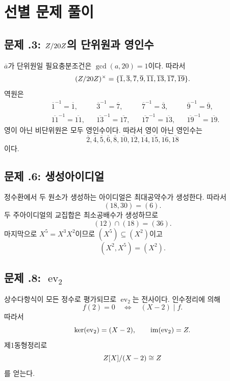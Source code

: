 \section{선별 문제 풀이}
\label{sec:ring-selected-solutions}

\subsection*{문제 \thechapter.3: $Z/20Z$의 단위원과 영인수}

\begin{solution}
$\overline a$가 단위원일 필요충분조건은 $\gcd(a,20)=1$이다. 따라서
\[
  (Z/20Z)^\times
  =\{\overline1,\overline3,\overline7,\overline9,
      \overline{11},\overline{13},\overline{17},\overline{19}\}.
\]
역원은
\[
\begin{aligned}
&\overline1^{-1}=\overline1,
&&\overline3^{-1}=\overline7,
&&\overline7^{-1}=\overline3,
&&\overline9^{-1}=\overline9,\\
&\overline{11}^{-1}=\overline{11},
&&\overline{13}^{-1}=\overline{17},
&&\overline{17}^{-1}=\overline{13},
&&\overline{19}^{-1}=\overline{19}.
\end{aligned}
\]
영이 아닌 비단위원은 모두 영인수이다. 따라서 영이 아닌 영인수는
\[
  \overline2,\overline4,\overline5,\overline6,\overline8,
  \overline{10},\overline{12},\overline{14},\overline{15},
  \overline{16},\overline{18}
\]
이다.
\end{solution}

\subsection*{문제 \thechapter.6: 생성아이디얼}

\begin{solution}
정수환에서 두 원소가 생성하는 아이디얼은 최대공약수가 생성한다. 따라서
\[
  (18,30)=(6).
\]
두 주아이디얼의 교집합은 최소공배수가 생성하므로
\[
  (12)\cap(18)=(36).
\]
마지막으로 $X^5=X^3X^2$이므로 $(X^5)\subseteq(X^2)$이고
\[
  (X^2,X^5)=(X^2).
\]
\end{solution}

\subsection*{문제 \thechapter.8: $\operatorname{ev}_2$}

\begin{solution}
상수다항식이 모든 정수로 평가되므로 $\operatorname{ev}_2$는 전사이다. 인수정리에 의해
\[
  f(2)=0\quad\Longleftrightarrow\quad (X-2)\mid f.
\]
따라서
\[
  \ker(\operatorname{ev}_2)=(X-2),
  \qquad
  \operatorname{im}(\operatorname{ev}_2)=Z.
\]
제1동형정리로
\[
  Z[X]/(X-2)\cong Z
\]
를 얻는다.
\end{solution}

